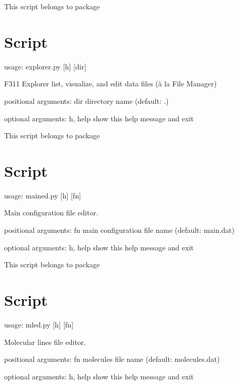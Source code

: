 \documentclass[letterpaper,10pt,english]{sphinxmanual}
\begin{document}
This script belongs to package 


\section{Script }
\label{\detokenize{autoscripts/script-explorer::doc}}\label{\detokenize{autoscripts/script-explorer:script-explorer-py}}
\begin{sphinxVerbatim}[commandchars=\\\{\}]
usage: explorer.py [\PYGZhy{}h] [dir]

F311 Explorer \PYGZhy{}\PYGZhy{}  list, visualize, and edit data files (\PYGZus{}à la\PYGZus{} File Manager)

positional arguments:
  dir         directory name (default: .)

optional arguments:
  \PYGZhy{}h, \PYGZhy{}\PYGZhy{}help  show this help message and exit
\end{sphinxVerbatim}

This script belongs to package 


\section{Script }
\label{\detokenize{autoscripts/script-mained:script-mained-py}}\label{\detokenize{autoscripts/script-mained::doc}}
\begin{sphinxVerbatim}[commandchars=\\\{\}]
usage: mained.py [\PYGZhy{}h] [fn]

Main configuration file editor.

positional arguments:
  fn          main configuration file name (default: main.dat)

optional arguments:
  \PYGZhy{}h, \PYGZhy{}\PYGZhy{}help  show this help message and exit
\end{sphinxVerbatim}

This script belongs to package 


\section{Script }
\label{\detokenize{autoscripts/script-mled:script-mled-py}}\label{\detokenize{autoscripts/script-mled::doc}}
\begin{sphinxVerbatim}[commandchars=\\\{\}]
usage: mled.py [\PYGZhy{}h] [fn]

Molecular lines file editor.

positional arguments:
  fn          molecules file name (default: molecules.dat)

optional arguments:
  \PYGZhy{}h, \PYGZhy{}\PYGZhy{}help  show this help message and exit
\end{sphinxVerbatim}
\end{document}
